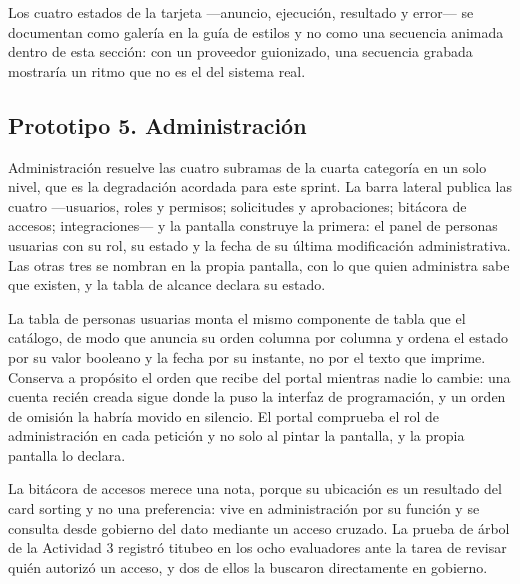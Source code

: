 Los cuatro estados de la tarjeta ---anuncio, ejecución, resultado y error--- se documentan como
galería en la guía de estilos y no como una secuencia animada dentro de esta sección: con un
proveedor guionizado, una secuencia grabada mostraría un ritmo que no es el del sistema real.

\clearpage
\subsection{Prototipo 5. Administración}

Administración resuelve las cuatro subramas de la cuarta categoría en un solo nivel, que es la
degradación acordada para este sprint. La barra lateral publica las cuatro ---usuarios, roles y
permisos; solicitudes y aprobaciones; bitácora de accesos; integraciones--- y la pantalla construye
la primera: el panel de personas usuarias con su rol, su estado y la fecha de su última modificación
administrativa. Las otras tres se nombran en la propia pantalla, con lo que quien administra sabe
que existen, y la tabla de alcance declara su estado.


La tabla de personas usuarias monta el mismo componente de tabla que el catálogo, de modo que
anuncia su orden columna por columna y ordena el estado por su valor booleano y la fecha por su
instante, no por el texto que imprime. Conserva a propósito el orden que recibe del portal mientras
nadie lo cambie: una cuenta recién creada sigue donde la puso la interfaz de programación, y un
orden de omisión la habría movido en silencio. El portal comprueba el rol de administración en cada
petición y no solo al pintar la pantalla, y la propia pantalla lo declara.

La bitácora de accesos merece una nota, porque su ubicación es un resultado del card sorting y no
una preferencia: vive en administración por su función y se consulta desde gobierno del dato
mediante un acceso cruzado. La prueba de árbol de la Actividad 3 registró titubeo en los ocho
evaluadores ante la tarea de revisar quién autorizó un acceso, y dos de ellos la buscaron
directamente en gobierno.

